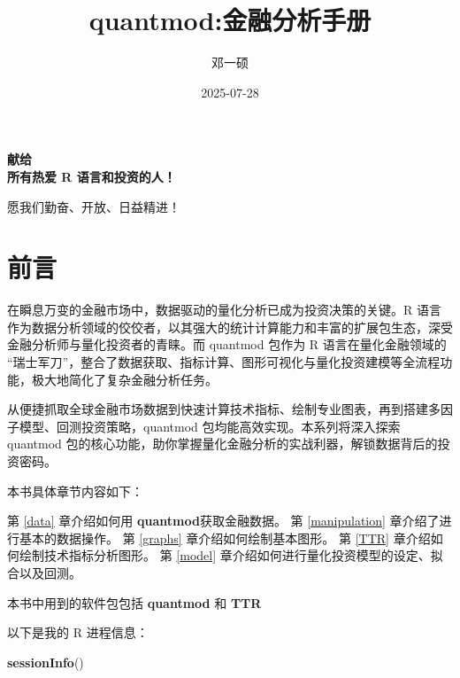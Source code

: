 \documentclass[]{ctexbook}
\title{quantmod:金融分析手册}
\author{邓一硕}
\date{2025-07-28}
\newenvironment{Shaded}{\begin{snugshade}}{\end{snugshade}}
\newcommand{\FunctionTok}[1]{\textcolor[rgb]{0.13,0.29,0.53}{\textbf{#1}}}
\newcommand{\NormalTok}[1]{#1}
\begin{document}
\maketitle

\thispagestyle{empty}

\begin{center}  %
     \Large\bfseries 献给\\[2cm]  %
    所有热爱 R 语言和投资的人！ %
    \par  %
    愿我们勤奋、开放、日益精进！ %
\end{center}

\setlength{\abovedisplayskip}{-5pt}
\setlength{\abovedisplayshortskip}{-5pt}

{
\setcounter{tocdepth}{2}
\tableofcontents
}
\listoftables
\listoffigures
\chapter*{前言}\label{ux524dux8a00}


在瞬息万变的金融市场中，数据驱动的量化分析已成为投资决策的关键。R 语言作为数据分析领域的佼佼者，以其强大的统计计算能力和丰富的扩展包生态，深受金融分析师与量化投资者的青睐。而 quantmod 包作为 R 语言在量化金融领域的 ``瑞士军刀''，整合了数据获取、指标计算、图形可视化与量化投资建模等全流程功能，极大地简化了复杂金融分析任务。

从便捷抓取全球金融市场数据到快速计算技术指标、绘制专业图表，再到搭建多因子模型、回测投资策略，quantmod 包均能高效实现。本系列将深入探索 quantmod 包的核心功能，助你掌握量化金融分析的实战利器，解锁数据背后的投资密码。

本书具体章节内容如下：

第 \ref{data} 章介绍如何用 \textbf{quantmod}\citep{quantmod}获取金融数据。 第 \ref{manipulation} 章介绍了进行基本的数据操作。 第 \ref{graphs} 章介绍如何绘制基本图形。 第 \ref{TTR} 章介绍如何绘制技术指标分析图形。 第 \ref{model} 章介绍如何进行量化投资模型的设定、拟合以及回测。

本书中用到的软件包包括 \textbf{quantmod}\citep{quantmod} 和 \textbf{TTR}\citep{TTR}

以下是我的 R 进程信息：

\begin{Shaded}
\begin{Highlighting}[]
\FunctionTok{sessionInfo}\NormalTok{()}
\end{Highlighting}
\end{Shaded}
\end{document}
